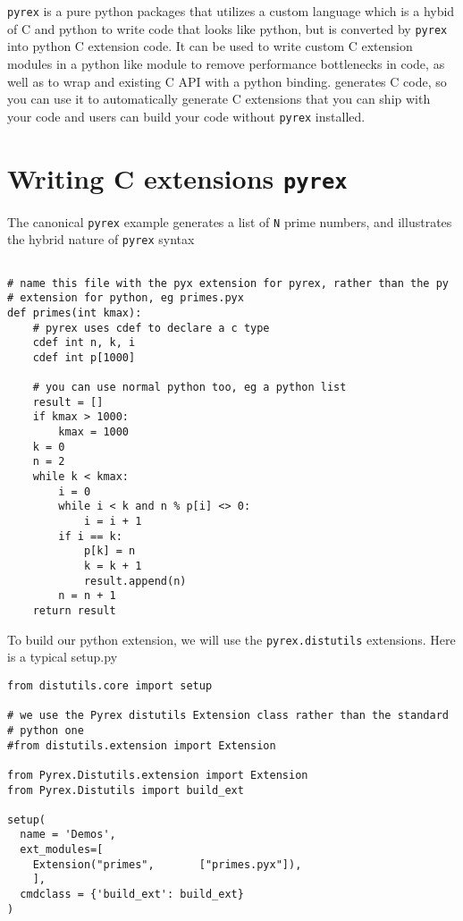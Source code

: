 \texttt{pyrex} is a pure python packages that utilizes a custom
language which is a hybid of C and python to write code that looks
like python, but is converted by \texttt{pyrex} into python C
extension code.  It can be used to write custom C extension modules in
a python like module to remove performance bottlenecks in code, as
well as to wrap and existing C API with a python binding.  
generates C code, so you can use it to automatically generate C
extensions that you can ship with your code and users can build your
code without \texttt{pyrex} installed.

\section{Writing C extensions \texttt{pyrex}}

The canonical \texttt{pyrex} example generates a list of \texttt{N}
prime numbers, and illustrates the hybrid nature of \texttt{pyrex}
syntax

\begin{lstlisting}

# name this file with the pyx extension for pyrex, rather than the py
# extension for python, eg primes.pyx
def primes(int kmax):
    # pyrex uses cdef to declare a c type
    cdef int n, k, i
    cdef int p[1000]

    # you can use normal python too, eg a python list
    result = []
    if kmax > 1000:
        kmax = 1000
    k = 0
    n = 2
    while k < kmax:
        i = 0
        while i < k and n % p[i] <> 0:
            i = i + 1
        if i == k:
            p[k] = n
            k = k + 1
            result.append(n)
        n = n + 1
    return result

\end{lstlisting}

To build our python extension, we will use the \texttt{pyrex.distutils}
extensions.  Here is a typical setup.py

\begin{lstlisting}
from distutils.core import setup

# we use the Pyrex distutils Extension class rather than the standard
# python one
#from distutils.extension import Extension

from Pyrex.Distutils.extension import Extension
from Pyrex.Distutils import build_ext

setup(
  name = 'Demos',
  ext_modules=[
    Extension("primes",       ["primes.pyx"]),
    ],
  cmdclass = {'build_ext': build_ext}
)

\end{lstlisting}

